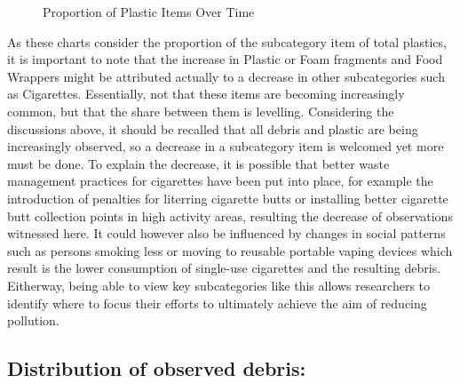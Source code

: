 \documentclass[10pt]{article}\usepackage[]{graphicx}\usepackage[]{color}
\newenvironment{knitrout}{}{} %
\begin{document}
\begin{figure}[H]
\begin{center}
\begin{knitrout}
\end{knitrout}
\caption {Proportion of Plastic Items Over Time}
\label{figF4}
\end {center}
\end {figure}


As these charts consider the proportion of the subcategory item of total plastics, it is important to note that the increase in Plastic or Foam fragments and Food Wrappers might be attributed actually to a decrease in other subcategories such as Cigarettes. Essentially, not that these items are becoming increasingly common, but that the share between them is levelling. Considering the discussions above, it should be recalled that all debris and plastic are being increasingly observed, so a decrease in a subcategory item is welcomed yet more must be done. To explain the decrease, it is possible that better waste management practices for cigarettes have been put into place, for example the introduction of penalties for literring cigarette butts or installing better cigarette butt collection points in high activity areas, resulting the decrease of observations witnessed here. It could however also be influenced by changes in social patterns such as persons smoking less or moving to reusable portable vaping devices which result is the lower consumption of single-use cigarettes and the resulting debris. Eitherway, being able to view key subcategories like this allows researchers to identify where to focus their efforts to ultimately achieve the aim of reducing pollution. 

\pagebreak
\subsection {Distribution of observed debris:}
\end{document}
